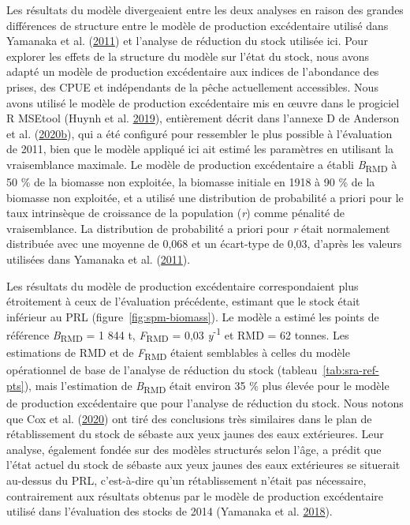 \documentclass[11pt]{book}
\begin{document}
Les résultats du modèle divergeaient entre les deux analyses en raison des grandes différences de structure entre le modèle de production excédentaire utilisé dans Yamanaka et al. (\protect\hyperlink{ref-yamanaka2011}{2011}) et l'analyse de réduction du stock utilisée ici. Pour explorer les effets de la structure du modèle sur l'état du stock, nous avons adapté un modèle de production excédentaire aux indices de l'abondance des prises, des CPUE et indépendants de la pêche actuellement accessibles. Nous avons utilisé le modèle de production excédentaire mis en œuvre dans le progiciel R MSEtool (Huynh et al. \protect\hyperlink{ref-huynh_msetool_2019}{2019}), entièrement décrit dans l'annexe D de Anderson et al. (\protect\hyperlink{ref-anderson2020gfmp}{2020}\protect\hyperlink{ref-anderson2020gfmp}{b}), qui a été configuré pour ressembler le plus possible à l'évaluation de 2011, bien que le modèle appliqué ici ait estimé les paramètres en utilisant la vraisemblance maximale. Le modèle de production excédentaire a établi \emph{B}\textsubscript{RMD} à 50 \% de la biomasse non exploitée, la biomasse initiale en 1918 à 90 \% de la biomasse non exploitée, et a utilisé une distribution de probabilité a priori pour le taux intrinsèque de croissance de la population (\emph{r}) comme pénalité de vraisemblance. La distribution de probabilité a priori pour \emph{r} était normalement distribuée avec une moyenne de 0,068 et un écart-type de 0,03, d'après les valeurs utilisées dans Yamanaka et al. (\protect\hyperlink{ref-yamanaka2011}{2011}).

Les résultats du modèle de production excédentaire correspondaient plus étroitement à ceux de l'évaluation précédente, estimant que le stock était inférieur au PRL (figure~\ref{fig:spm-biomass}). Le modèle a estimé les points de référence \emph{B}\textsubscript{RMD} = 1 844 t, \emph{F}\textsubscript{RMD} = 0,03 \emph{y}\textsuperscript{-1} et RMD = 62 tonnes. Les estimations de RMD et de \emph{F}\textsubscript{RMD} étaient semblables à celles du modèle opérationnel de base de l'analyse de réduction du stock (tableau~\ref{tab:sra-ref-pts}), mais l'estimation de \emph{B}\textsubscript{RMD} était environ 35 \% plus élevée pour le modèle de production excédentaire que pour l'analyse de réduction du stock. Nous notons que Cox et al. (\protect\hyperlink{ref-cox2020}{2020}) ont tiré des conclusions très similaires dans le plan de rétablissement du stock de sébaste aux yeux jaunes des eaux extérieures. Leur analyse, également fondée sur des modèles structurés selon l'âge, a prédit que l'état actuel du stock de sébaste aux yeux jaunes des eaux extérieures se situerait au-dessus du PRL, c'est-à-dire qu'un rétablissement n'était pas nécessaire, contrairement aux résultats obtenus par le modèle de production excédentaire utilisé dans l'évaluation des stocks de 2014 (Yamanaka et al. \protect\hyperlink{ref-yamanaka2018yelloweyeoutside}{2018}).
\end{document}
